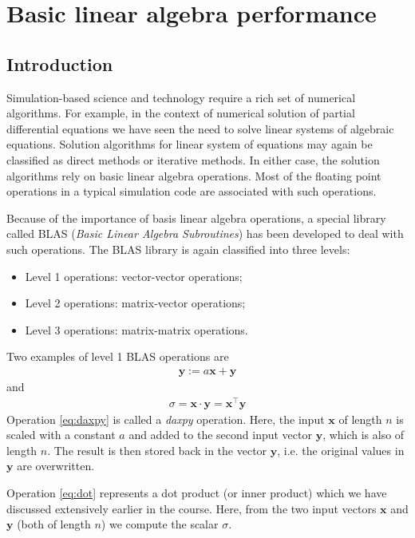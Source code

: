 \chapter{Basic linear algebra performance}

\section{Introduction}

Simulation-based science and technology require a rich set of numerical
algorithms. For example, in the context of numerical solution of partial
differential equations we have seen the need to solve linear systems of
algebraic equations. Solution algorithms for linear system of equations may
again be classified as direct methods or iterative methods. In either case, the
solution algorithms rely on basic linear algebra operations. Most of the
floating point operations in a typical simulation code are associated with such
operations.

Because of the importance of basis linear algebra operations, a special library
called BLAS (\emph{Basic Linear Algebra Subroutines}) has been developed to deal
with such operations. The BLAS library is again classified into three levels:
\begin{itemize}
\item Level 1 operations: vector-vector operations;
\item Level 2 operations: matrix-vector operations;
\item Level 3 operations: matrix-matrix operations.
\end{itemize}
Two examples of level 1 BLAS operations are
\begin{align}
  \bm y := a \bm x + \bm y
  \label{eq:daxpy}
\end{align}
and
\begin{align}
  \sigma = \bm x \cdot \bm y = \bm x^\intercal \bm y
  \label{eq:dot}
\end{align}
Operation \eqref{eq:daxpy} is called a {\em daxpy} operation. Here, the input
$\bm x$ of length $n$ is scaled with a constant $a$ and added to the second
input vector $\bm y$, which is also of length $n$. The result is then stored
back in the vector $\bm y$, i.e. the original values in $\bm y$ are overwritten.

Operation \eqref{eq:dot} represents a dot product (or inner product) which we
have discussed extensively earlier in the course. Here, from the two input
vectors $\bm x$ and $\bm y$ (both of length $n$) we compute the scalar $\sigma$.

